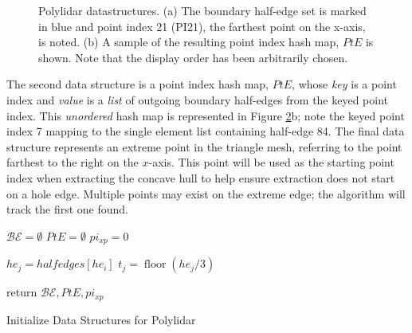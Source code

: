 \begin{figure}[ht]
\begin{subfigure}[t]{.25\linewidth}
    \caption{}
    \label{fig:ch2_hashmap}
  \end{subfigure}
  \caption[Polylidar datastructures]{Polylidar datastructures. (a) The boundary half-edge set is marked in blue and point index 21 (PI21), the farthest point on the x-axis, is noted. (b) A sample of the resulting point index hash map, $PtE$ is shown. Note that the display order has been arbitrarily chosen.  }
  \label{fig:ch2_algorithm1_visual} 
\end{figure}

The second data structure is a point index hash map, $PtE$, whose \emph{key} is a point index and \emph{value} is a \emph{list} of outgoing boundary half-edges from the keyed point index. This \emph{unordered} hash map is represented in Figure \ref{fig:ch2_algorithm1_visual}b; note the keyed point index 7 mapping to the single element list containing half-edge 84. The final data structure represents an extreme point in the triangle mesh, referring to the point farthest to the right on the $x$-axis. This point will be used as the starting point index when extracting the concave hull to help ensure extraction does not start on a hole edge. Multiple points may exist on the extreme edge;  the algorithm will track the first one found. 

\begin{algorithm}[ht]

    
    $\mathcal{BE} = \emptyset$ 
    $PtE = \emptyset$ 
    $pi_{xp} = 0$ 
     { 
         { 
            $he_j = halfedges[he_i]$
            $t_j = \operatorname{floor}(he_j / 3)$ 
        }
  
    }
    return $\mathcal{BE}, PtE, pi_{xp}$
    \caption{Initialize Data Structures for Polylidar}\label{alg:ch2_boundary_edges}
\end{algorithm}


